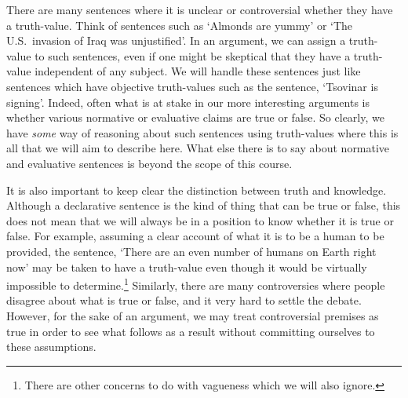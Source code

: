 There are many sentences where it is unclear or controversial whether they have a truth-value.
Think of sentences such as `Almonds are yummy' or `The U.S.\ invasion of Iraq was unjustified'.
In an argument, we can assign a truth-value to such sentences, even if one might be skeptical that they have a truth-value independent of any subject.
We will handle these sentences just like sentences which have objective truth-values such as the sentence, `Tsovinar is signing'.
Indeed, often what is at stake in our more interesting arguments is whether various normative or evaluative claims are true or false.
So clearly, we have \textit{some} way of reasoning about such sentences using truth-values where this is all that we will aim to describe here.
What else there is to say about normative and evaluative sentences is beyond the scope of this course.


It is also important to keep clear the distinction between truth and knowledge.
Although a declarative sentence is the kind of thing that can be true or false, this does not mean that we will always be in a position to know whether it is true or false.
For example, assuming a clear account of what it is to be a human to be provided, the sentence, `There are an even number of humans on Earth right now' may be taken to have a truth-value even though it would be virtually impossible to determine.\footnote{There are other concerns to do with vagueness which we will also ignore.}
Similarly, there are many controversies where people disagree about what is true or false, and it very hard to settle the debate.
However, for the sake of an argument, we may treat controversial premises as true in order to see what follows as a result without committing ourselves to these assumptions.

